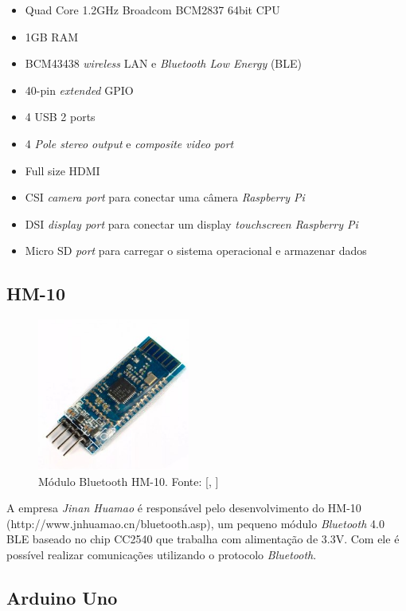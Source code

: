 \documentclass[
	12pt,				%
	oneside,			%
	a4paper,			%
	brazil				%
]{abntex2}
\newcommand{\citecustom}[1]{[\citeauthoronline{#1}, \citeyear{#1}]}
\begin{document}
{\begin{itemize}
\item Quad Core 1.2GHz Broadcom BCM2837 64bit CPU
\item 1GB RAM
\item BCM43438 \textit{wireless} LAN e \textit{Bluetooth Low Energy} (BLE)
\item 40-pin \textit{extended} GPIO
\item 4 USB 2 ports
\item 4 \textit{Pole stereo output} e \textit{composite video port}
\item Full size HDMI
\item CSI \textit{camera port} para conectar uma câmera \textit{Raspberry Pi}
\item DSI \textit{display port} para conectar um display \textit{touchscreen Raspberry Pi}
\item Micro SD \textit{port} para carregar o sistema operacional e armazenar dados
\end{itemize}


\subsection{HM-10}

\begin{figure}[!h]
\centering
\includegraphics[width=5cm, center]{images/hm-10}
\caption{Módulo Bluetooth HM-10. Fonte: \citecustom{hm10image}}
\label{Rotulo}
\end{figure}

A empresa \textit{Jinan Huamao} é responsável pelo desenvolvimento do HM-10 (http://www.jnhuamao.cn/bluetooth.asp), um pequeno módulo \textit{Bluetooth} 4.0 BLE baseado no chip CC2540 que trabalha com alimentação de 3.3V. Com ele é possível realizar comunicações utilizando o protocolo \textit{Bluetooth}.

\newpage

\subsection{Arduino Uno}

}
\end{document}
